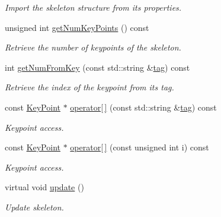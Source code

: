 \begin{DoxyCompactItemize}
\begin{DoxyCompactList}\small\item\em Import the skeleton structure from its properties. \end{DoxyCompactList}\item 
unsigned int \mbox{\hyperlink{classassistive__rehab_1_1Skeleton_ac5e5b98f2c9178f6e0def5033e27922f}{get\+Num\+Key\+Points}} () const
\begin{DoxyCompactList}\small\item\em Retrieve the number of keypoints of the skeleton. \end{DoxyCompactList}\item 
int \mbox{\hyperlink{classassistive__rehab_1_1Skeleton_a954bfa99e0dad997ca6d93495246d3f1}{get\+Num\+From\+Key}} (const std\+::string \&\mbox{\hyperlink{classassistive__rehab_1_1Skeleton_a3d1ce5280300e012826948dc4383c2cb}{tag}}) const
\begin{DoxyCompactList}\small\item\em Retrieve the index of the keypoint from its tag. \end{DoxyCompactList}\item 
const \mbox{\hyperlink{classassistive__rehab_1_1KeyPoint}{Key\+Point}} $\ast$ \mbox{\hyperlink{classassistive__rehab_1_1Skeleton_a3ecc7418af653c88e40d41bb379b7271}{operator\mbox{[}$\,$\mbox{]}}} (const std\+::string \&\mbox{\hyperlink{classassistive__rehab_1_1Skeleton_a3d1ce5280300e012826948dc4383c2cb}{tag}}) const
\begin{DoxyCompactList}\small\item\em Keypoint access. \end{DoxyCompactList}\item 
const \mbox{\hyperlink{classassistive__rehab_1_1KeyPoint}{Key\+Point}} $\ast$ \mbox{\hyperlink{classassistive__rehab_1_1Skeleton_a0692ab89f16b0914b9ca9e0d4a07e52c}{operator\mbox{[}$\,$\mbox{]}}} (const unsigned int i) const
\begin{DoxyCompactList}\small\item\em Keypoint access. \end{DoxyCompactList}\item 
\mbox{\label{classassistive__rehab_1_1Skeleton_a1ba2ba229331f7966ff1bce10c776d99}} 
virtual void \mbox{\hyperlink{classassistive__rehab_1_1Skeleton_a1ba2ba229331f7966ff1bce10c776d99}{update}} ()
\begin{DoxyCompactList}\small\item\em Update skeleton. \end{DoxyCompactList}\item 

\end{DoxyCompactItemize}

